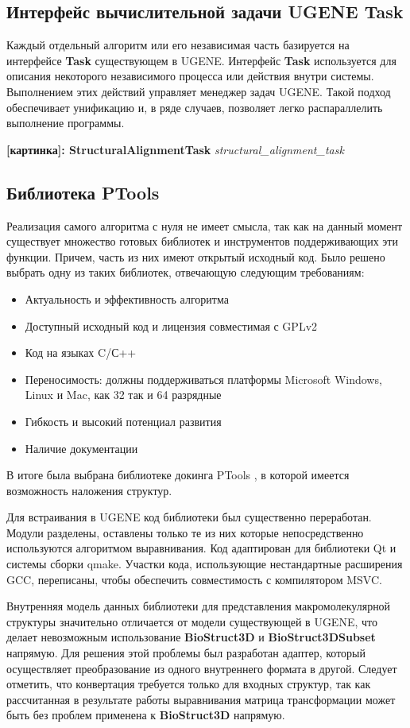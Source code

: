 \documentclass[a4paper, 12pt, titlepage, utf8]{extarticle}
\newcommand{\class}{\textbf}
\newcommand{\myimage}[2]{   
    \begin{center} \textbf{[картинка]: #1} \textit{#2} \end{center} 
}
\begin{document}
\subsection{Интерфейс вычислительной задачи UGENE Task}
Каждый отдельный алгоритм или его независимая часть базируется на интерфейсе \class{Task} существующем в UGENE. Интерфейс \class{Task} используется для описания некоторого независимого процесса или действия внутри системы. Выполнением этих действий управляет менеджер задач UGENE. Такой подход обеспечивает унификацию и, в ряде случаев, позволяет легко распараллелить выполнение программы.

\myimage{StructuralAlignmentTask}{structural\_alignment\_task}

\subsection{Библиотека PTools}
Реализация самого алгоритма с нуля не имеет смысла, так как на данный момент существует множество готовых библиотек и инструментов поддерживающих эти функции. Причем, часть из них имеют открытый исходный код. Было решено выбрать одну из таких библиотек, отвечающую следующим требованиям:

\begin{itemize}
    \item Актуальность и эффективность алгоритма
    \item Доступный исходный код и лицензия совместимая с GPLv2 \cite{gpl}
    \item Код на языках C/С++
    \item Переносимость: должны поддерживаться платформы Microsoft Windows, Linux и Mac, как 32 так и 64 разрядные
    \item Гибкость и высокий потенциал развития
    \item Наличие документации
\end{itemize}

В итоге была выбрана библиотеке докинга PTools \cite{ptools}, в которой имеется возможность наложения структур. 

Для встраивания в UGENE код библиотеки был существенно переработан. Модули разделены, оставлены только те из них которые непосредственно используются алгоритмом выравнивания. Код адаптирован для библиотеки Qt и системы сборки qmake. Участки кода, использующие нестандартные расширения GCC, переписаны, чтобы обеспечить совместимость с компилятором MSVC.

Внутренняя модель данных библиотеки для представления макромолекулярной структуры значительно отличается от модели существующей в UGENE, что делает невозможным использование \class{BioStruct3D} и \class{BioStruct3DSubset} напрямую. Для решения этой проблемы был разработан адаптер, который осуществляет преобразование из одного внутреннего формата в другой. Следует отметить, что конвертация требуется только для входных структур, так как рассчитанная в результате работы выравнивания матрица трансформации может быть без проблем применена к \class{BioStruct3D} напрямую.
\end{document}
